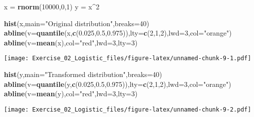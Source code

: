 \documentclass[]{article}
\newenvironment{Shaded}{\begin{snugshade}}{\end{snugshade}}
\newcommand{\KeywordTok}[1]{\textcolor[rgb]{0.13,0.29,0.53}{\textbf{#1}}}
\newcommand{\DataTypeTok}[1]{\textcolor[rgb]{0.13,0.29,0.53}{#1}}
\newcommand{\DecValTok}[1]{\textcolor[rgb]{0.00,0.00,0.81}{#1}}
\newcommand{\FloatTok}[1]{\textcolor[rgb]{0.00,0.00,0.81}{#1}}
\newcommand{\StringTok}[1]{\textcolor[rgb]{0.31,0.60,0.02}{#1}}
\newcommand{\OperatorTok}[1]{\textcolor[rgb]{0.81,0.36,0.00}{\textbf{#1}}}
\newcommand{\NormalTok}[1]{#1}
\begin{document}
\begin{Shaded}
\begin{Highlighting}[]
\NormalTok{x =}\StringTok{ }\KeywordTok{rnorm}\NormalTok{(}\DecValTok{10000}\NormalTok{,}\DecValTok{0}\NormalTok{,}\DecValTok{1}\NormalTok{)}
\NormalTok{y =}\StringTok{ }\NormalTok{x}\OperatorTok{^}\DecValTok{2}

\KeywordTok{hist}\NormalTok{(x,}\DataTypeTok{main=}\StringTok{"Original distribution"}\NormalTok{,}\DataTypeTok{breaks=}\DecValTok{40}\NormalTok{)}
\KeywordTok{abline}\NormalTok{(}\DataTypeTok{v=}\KeywordTok{quantile}\NormalTok{(x,}\KeywordTok{c}\NormalTok{(}\FloatTok{0.025}\NormalTok{,}\FloatTok{0.5}\NormalTok{,}\FloatTok{0.975}\NormalTok{)),}\DataTypeTok{lty=}\KeywordTok{c}\NormalTok{(}\DecValTok{2}\NormalTok{,}\DecValTok{1}\NormalTok{,}\DecValTok{2}\NormalTok{),}\DataTypeTok{lwd=}\DecValTok{3}\NormalTok{,}\DataTypeTok{col=}\StringTok{"orange"}\NormalTok{)}
\KeywordTok{abline}\NormalTok{(}\DataTypeTok{v=}\KeywordTok{mean}\NormalTok{(x),}\DataTypeTok{col=}\StringTok{"red"}\NormalTok{,}\DataTypeTok{lwd=}\DecValTok{3}\NormalTok{,}\DataTypeTok{lty=}\DecValTok{3}\NormalTok{)}
\end{Highlighting}
\end{Shaded}

\texttt{[image: Exercise\_02\_Logistic\_files/figure-latex/unnamed-chunk-9-1.pdf]}

\begin{Shaded}
\begin{Highlighting}[]
\KeywordTok{hist}\NormalTok{(y,}\DataTypeTok{main=}\StringTok{"Transformed distribution"}\NormalTok{,}\DataTypeTok{breaks=}\DecValTok{40}\NormalTok{)}
\KeywordTok{abline}\NormalTok{(}\DataTypeTok{v=}\KeywordTok{quantile}\NormalTok{(y,}\KeywordTok{c}\NormalTok{(}\FloatTok{0.025}\NormalTok{,}\FloatTok{0.5}\NormalTok{,}\FloatTok{0.975}\NormalTok{)),}\DataTypeTok{lty=}\KeywordTok{c}\NormalTok{(}\DecValTok{2}\NormalTok{,}\DecValTok{1}\NormalTok{,}\DecValTok{2}\NormalTok{),}\DataTypeTok{lwd=}\DecValTok{3}\NormalTok{,}\DataTypeTok{col=}\StringTok{"orange"}\NormalTok{)}
\KeywordTok{abline}\NormalTok{(}\DataTypeTok{v=}\KeywordTok{mean}\NormalTok{(y),}\DataTypeTok{col=}\StringTok{"red"}\NormalTok{,}\DataTypeTok{lwd=}\DecValTok{3}\NormalTok{,}\DataTypeTok{lty=}\DecValTok{3}\NormalTok{)}
\end{Highlighting}
\end{Shaded}

\texttt{[image: Exercise\_02\_Logistic\_files/figure-latex/unnamed-chunk-9-2.pdf]}
\end{document}

